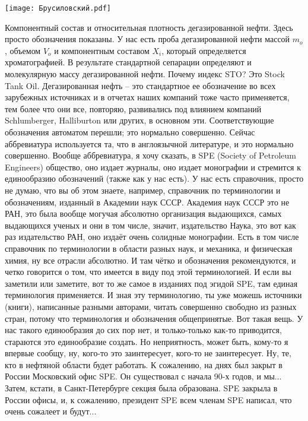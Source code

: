 \documentclass[main.tex]{subfiles}
\begin{document}
\begin{center}
\texttt{[image: Брусиловский.pdf]}
\end{center}

Компонентный состав и относительная плотность дегазированной нефти.
Здесь просто обозначения показаны.
У нас есть проба дегазированной нефти массой $m_o$, объемом $V_o$ и компонентным составом $X_i$, который определяется хроматографией.
В результате стандартной сепарации определяют и молекулярную массу дегазированной нефти.
Почему индекс STO? Это Stock Tank Oil.
Дегазированная нефть -- это стандартное ее обозначение во всех зарубежных источниках и в отчетах наших компаний тоже часто применяется, тем более что они все, повторяю, развивались под влиянием компаний Schlumberger, Halliburton или других, в основном эти.
Соответствующие обозначения автоматом перешли; это нормально совершенно.
Сейчас аббревиатура используется та, что в англоязычной литературе, и это нормально совершенно.
Вообще аббревиатура, я хочу сказать, в SPE (Society of Petroleum Engineers) общество, оно издает журналы, оно издает монографии и стремится к единообразию обозначений (также как у нас есть).
У нас есть справочник, просто не думаю, что вы об этом знаете, например, справочник по терминологии и обозначениям, изданный в Академии наук СССР.
Академия наук СССР это не РАН, это была вообще могучая абсолютно организация выдающихся, самых выдающихся ученых и они в том числе, значит, издательство Наука, это вот как раз издательство РАН, оно издаёт очень солидные монографии.
Есть в том числе справочник по терминологии в области разных наук, и механика, и физическая химия, ну все отрасли абсолютно.
И там чётко и обозначения рекомендуются, и четко говорится о том, что имеется в виду под этой терминологией.
И если вы заметили или заметите, вот то же самое в изданиях под эгидой SPE, там единая терминология применяется.
И зная эту терминологию, ты уже можешь источники (книги), написанные разными авторами, читать совершенно свободно из разных стран, потому что терминология и обозначения общепринятые.
Вот такая вещь.
У нас такого единообразия до сих пор нет, и только-только как-то приводится, стараются это единообразие создать.
Но неприятность, может быть, кому-то я впервые сообщу, ну, кого-то это заинтересует, кого-то не заинтересует.
Ну, те, кто в нефтяной области будет работать.
К сожалению, на днях был закрыт в России Московский офис SPE.
Он существовал с начала 90-х годов, и мы...
Затем, кстати, в Санкт-Петербурге секция была образована.
SPE закрыла в России офисы, и, к сожалению, президент SPE всем членам SPE написал, что очень сожалеет и будут...
\end{document}
